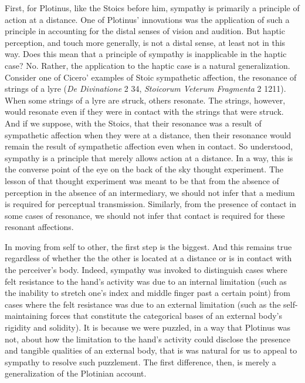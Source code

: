 First, for Plotinus, like the Stoics before him, sympathy is primarily a principle of action at a distance. One of Plotinus' innovations was the application of such a principle in accounting for the distal senses of vision and audition. But haptic perception, and touch more generally, is not a distal sense, at least not in this way. Does this mean that a principle of sympathy is inapplicable in the haptic case? No. Rather, the application to the haptic case is a natural generalization. Consider one of Cicero' examples of Stoic sympathetic affection, the resonance of strings of a lyre (\emph{De Divinatione} 2 34, \emph{Stoicorum Veterum Fragmenta} 2 1211). When some strings of a lyre are struck, others resonate. The strings, however, would resonate even if they were in contact with the strings that were struck. And if we suppose, with the Stoics, that their resonance was a result of sympathetic affection when they were at a distance, then their resonance would remain the result of sympathetic affection even when in contact. So understood, sympathy is a principle that merely allows action at a distance. In a way, this is the converse point of the eye on the back of the sky thought experiment. The lesson of that thought experiment was meant to be that from the absence of perception in the absence of an intermediary, we should not infer that a medium is required for perceptual transmission. Similarly, from the presence of contact in some cases of resonance, we should not infer that contact is required for these resonant affections.

In moving from self to other, the first step is the biggest. And this remains true regardless of whether the the other is located at a distance or is in contact with the perceiver's body. Indeed, sympathy was invoked to distinguish cases where felt resistance to the hand's activity was due to an internal limitation (such as the inability to stretch one's index and middle finger past a certain point) from cases where the felt resistance was due to an external limitation (such as the self-maintaining forces that constitute the categorical bases of an external body's rigidity and solidity). It is because we were puzzled, in a way that Plotinus was not, about how the limitation to the hand's activity could disclose the presence and tangible qualities of an external body, that is was natural for us to appeal to sympathy to resolve such puzzlement. The first difference, then, is merely a generalization of the Plotinian account.

